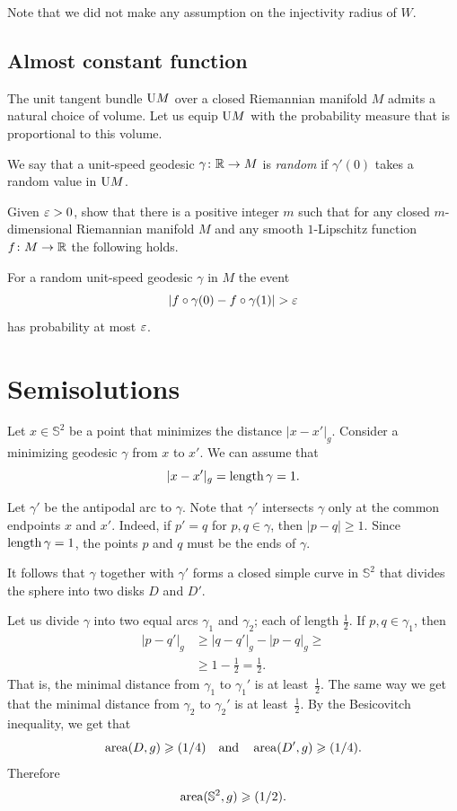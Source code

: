 Note that we did not make any assumption on the injectivity radius of $W$.

\subsection*{Almost constant function}
\label{Almost constant function}

The unit tangent bundle $\mathrm{U} M$ over a closed Riemannian manifold $M$
admits a natural choice of volume.
Let us equip $\mathrm{U} M$ with the probability measure that is proportional to this volume.

We say that a unit-speed geodesic $\gamma\colon\mathbb{R}\to M$ is \emph{random}
if $\gamma'(0)$ takes a random value in $\mathrm{U} M$.

\begin{pr}
Given $\varepsilon>0$,
show that there is a positive integer $m$ such that
for any closed $m$-dimensional Riemannian manifold $M$
and any smooth $1$-Lipschitz function $f\colon M\to\mathbb{R}$ the following holds.

For a random unit-speed geodesic $\gamma$ in $M$ 
the event 
\[|f\circ\gamma(0)-f\circ\gamma(1)|>\eps\]
has probability at most $\varepsilon$.
\end{pr}


\section*{Semisolutions}

Let $x\in \mathbb{S}^2$ be a point that minimizes the distance $|x-x'|_g$.
Consider a minimizing geodesic $\gamma$ from $x$ to $x'$.
We can assume that 
\[|x-x'|_g=\operatorname{\rm length} \gamma=1.\]

Let $\gamma'$ be the antipodal arc to $\gamma$.
Note that $\gamma'$ intersects $\gamma$ only at the common endpoints $x$ and $x'$.
Indeed, if $p'=q$ for $p,q\in\gamma$, then $|p-q|\ge 1$.
Since $\operatorname{\rm length} \gamma=1$, the points $p$ and $q$ must be the ends of $\gamma$.

It follows that $\gamma$ together with $\gamma'$ forms a closed simple curve in $\mathbb{S}^2$
that divides the sphere into two disks $D$ and $D'$.

Let us divide $\gamma$ into two equal arcs $\gamma_1$ and $\gamma_2$; each of length $\tfrac12$.
If $p,q\in\gamma_1$, then
\begin{align*}
|p-q'|_g&\ge |q-q'|_g-|p-q|_g\ge
\\
&\ge 1-\tfrac12=\tfrac12.
\end{align*}
That is, the minimal distance from $\gamma_1$ to $\gamma_1'$ is at least~$\tfrac12$.
The same way we get that the minimal distance from $\gamma_2$ to $\gamma_2'$ is at least~$\tfrac12$.
By the Besicovitch inequality, we get that
\[\operatorname{\rm area}\nolimits(D,g)\geqslant (1/4)\quad\text{and}\quad \operatorname{\rm area}\nolimits(D',g)\geqslant (1/4).\]
Therefore 
\[\operatorname{\rm area}\nolimits(\mathbb{S}^2,g)\geqslant(1/2).\]
\qedsf

